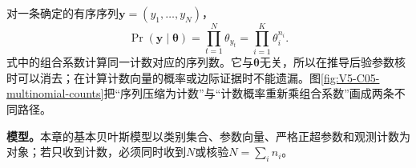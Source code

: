 \documentclass[UTF8,a4paper,11pt,openany]{ctexbook}
\begin{document}
\setcounter{page}{825}
\setcounter{chapter}{34}
\setcounter{figure}{1}
\setcounter{equation}{1}
\pagestyle{headings}
对一条确定的有序序列$\boldsymbol y=(y_1,\ldots,y_N)$，
\begin{equation}
\Pr(\boldsymbol y\mid\boldsymbol\theta)
=\prod_{t=1}^N\theta_{y_t}
=\prod_{i=1}^K\theta_i^{n_i}.
\end{equation}
式中的组合系数计算同一计数对应的序列数。它与$\boldsymbol\theta$无关，所以在推导后验参数核时可以消去；在计算计数向量的概率或边际证据时不能遗漏。图\ref{fig:V5-C05-multinomial-counts}把“序列压缩为计数”与“计数概率重新乘组合系数”画成两条不同路径。

\FloatBarrier
\textbf{模型。}本章的基本贝叶斯模型以类别集合、参数向量、严格正超参数和观测计数为对象；若只收到计数，必须同时收到$N$或核验$N=\sum_i n_i$。
\end{document}
